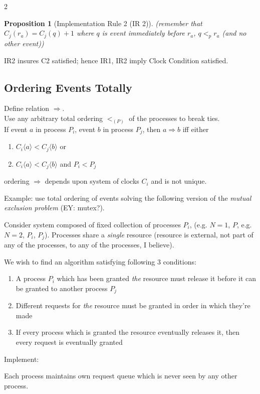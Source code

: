 \documentclass[10pt]{amsart}
\newtheorem{proposition}{Proposition}
\begin{document}
\begin{multicols*}{2}
\begin{proposition}[Implementation Rule 2 (IR 2)]
(remember that $C_j(r_a) = C_j(q) + 1$ where $q$ is event immediately before $r_a$, $q <_p r_a$ (and no other event))

\end{proposition}
IR2 insures C2 satisfied; hence IR1, IR2 imply Clock Condition satisfied.


\subsection{Ordering Events Totally}

Define relation $\Longrightarrow$. \\
Use any arbitrary total ordering $<_{(P)}$ of the processes to break ties. \\
If event $a$ in process $P_i$, event $b$ in process $P_j$, then $a \Longrightarrow b$ iff either 
\begin{enumerate}
	\item $C_i\langle a \rangle < C_j \langle b \rangle $ or 
	\item $C_i \langle a \rangle < C_j \langle b \rangle$ and $P_i < P_j$ 
\end{enumerate}
ordering $\Longrightarrow$ depends upon system of clocks $C_i$ and is not unique.

Example: use total ordering of events solving the following version of the \emph{mutual exclusion problem} (EY: mutex?).

Consider system composed of fixed collection of processes $P_i$, (e.g. $N=1$, $P$, e.g. $N=2$, $P_i$, $P_j$). Processes share a \emph{single} resource (resource is external, not part of any of the processes, to any of the processes, I believe). 

We wish to find an algorithm satisfying following 3 conditions:
\begin{enumerate}
	\item[(I)] A process $P_i$ which has been granted \emph{the} resource must release it before it can be granted to another process $P_j$ 
	\item[(II)] Different requests for \emph{the} resource must be granted in order in which they're made
	\item[(III)] If every process which is granted the resource eventually releases it, then every request is eventually granted
\end{enumerate}

Implement:

Each  process maintains own request queue which is never seen by any other process.


\end{multicols*}
\end{document}

